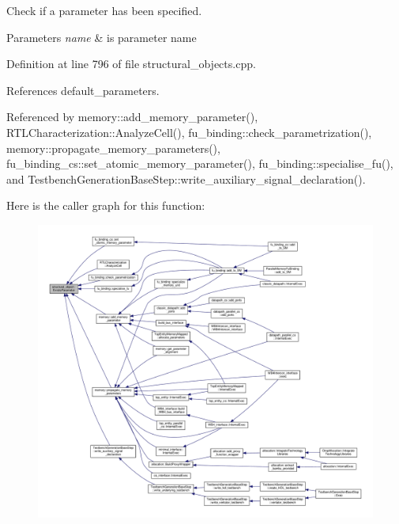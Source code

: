 Check if a parameter has been specified. 


\begin{DoxyParams}{Parameters}
{\em name} & is parameter name \\
\hline
\end{DoxyParams}


Definition at line 796 of file structural\+\_\+objects.\+cpp.



References default\+\_\+parameters.



Referenced by memory\+::add\+\_\+memory\+\_\+parameter(), R\+T\+L\+Characterization\+::\+Analyze\+Cell(), fu\+\_\+binding\+::check\+\_\+parametrization(), memory\+::propagate\+\_\+memory\+\_\+parameters(), fu\+\_\+binding\+\_\+cs\+::set\+\_\+atomic\+\_\+memory\+\_\+parameter(), fu\+\_\+binding\+::specialise\+\_\+fu(), and Testbench\+Generation\+Base\+Step\+::write\+\_\+auxiliary\+\_\+signal\+\_\+declaration().

Here is the caller graph for this function\+:
\nopagebreak
\begin{figure}[H]
\begin{center}
\leavevmode
\includegraphics[width=350pt]{d8/da3/classstructural__object_a8576345629efc406382a716de612d276_icgraph}
\end{center}
\end{figure}
\mbox{\label{classstructural__object_a87756f7dab3d9a866c81b96b88e11380}} 
